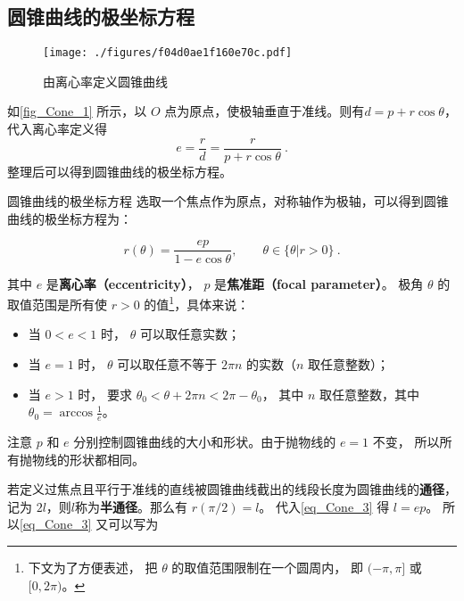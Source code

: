 

\subsection{圆锥曲线的极坐标方程}

\begin{figure}[ht]
\centering
\texttt{[image: ./figures/f04d0ae1f160e70c.pdf]}
\caption{由离心率定义圆锥曲线}\label{fig_Cone_1}
\end{figure}

如\autoref{fig_Cone_1} 所示，以 $O$ 点为原点，使极轴垂直于准线。则有$d = p + r \cos \theta$，代入离心率定义得
\begin{equation}\label{eq_Cone_2}
e=\frac{r}{d}=\frac{r}{p + r \cos \theta }~.
\end{equation}
整理后可以得到圆锥曲线的极坐标方程。
\begin{definition}{圆锥曲线的极坐标方程}
选取一个焦点作为原点，对称轴作为极轴，可以得到圆锥曲线的极坐标方程为：

\begin{equation}\label{eq_Cone_3}
r(\theta) = \frac{ep}{1 - e\cos \theta },\qquad\theta\in\{\theta|r>0\}~.
\end{equation}

其中 $e$ 是\textbf{离心率（eccentricity）}， $p$ 是\textbf{焦准距（focal parameter）}。 极角 $\theta$ 的取值范围是所有使 $r>0$ 的值\footnote{下文为了方便表述， 把 $\theta$ 的取值范围限制在一个圆周内， 即 $(-\pi,\pi]$ 或 $[0, 2\pi)$。}，具体来说：
\begin{itemize}
\item 当 $0 < e < 1$ 时，  $\theta$ 可以取任意实数；
\item 当 $e = 1$ 时， $\theta$ 可以取任意不等于 $2\pi n$ 的实数（$n$ 取任意整数）；
\item 当 $e > 1$ 时， 要求 $\theta_0< \theta + 2\pi n < 2\pi-\theta_0$， 其中 $n$ 取任意整数，其中$\displaystyle\theta_0 = \arccos\frac{1}{e}$。
\end{itemize}  
\end{definition}

注意 $p$ 和 $e$ 分别控制圆锥曲线的大小和形状。由于抛物线的 $e = 1$ 不变， 所以所有抛物线的形状都相同。

若定义过焦点且平行于准线的直线被圆锥曲线截出的线段长度为圆锥曲线的\textbf{通径}，记为 $2l$，则$l$称为\textbf{半通径}。那么有 $r(\pi /2) = l$。 代入\autoref{eq_Cone_3} 得 $l = ep$。 所以\autoref{eq_Cone_3} 又可以写为

